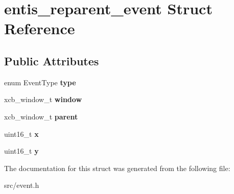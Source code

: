 \hypertarget{structentis__reparent__event}{}\section{entis\+\_\+reparent\+\_\+event Struct Reference}
\label{structentis__reparent__event}
\subsection*{Public Attributes}
\begin{DoxyCompactItemize}
\item 
\mbox{\label{structentis__reparent__event_ac5ff1ad76541f7e8357bd06c25f424ec}} 
enum Event\+Type {\bfseries type}
\item 
\mbox{\label{structentis__reparent__event_a2359cdd927e3224e8af7cda378c25888}} 
xcb\+\_\+window\+\_\+t {\bfseries window}
\item 
\mbox{\label{structentis__reparent__event_af06e126942bab6719175c004e500bb52}} 
xcb\+\_\+window\+\_\+t {\bfseries parent}
\item 
\mbox{\label{structentis__reparent__event_a64e0edbb3cd0cf3bb5254ba02fd11b6a}} 
uint16\+\_\+t {\bfseries x}
\item 
\mbox{\label{structentis__reparent__event_a00ef2aefb2de70b35ca53d716cd5bc17}} 
uint16\+\_\+t {\bfseries y}
\end{DoxyCompactItemize}


The documentation for this struct was generated from the following file\+:\begin{DoxyCompactItemize}
\item 
src/event.\+h\end{DoxyCompactItemize}
